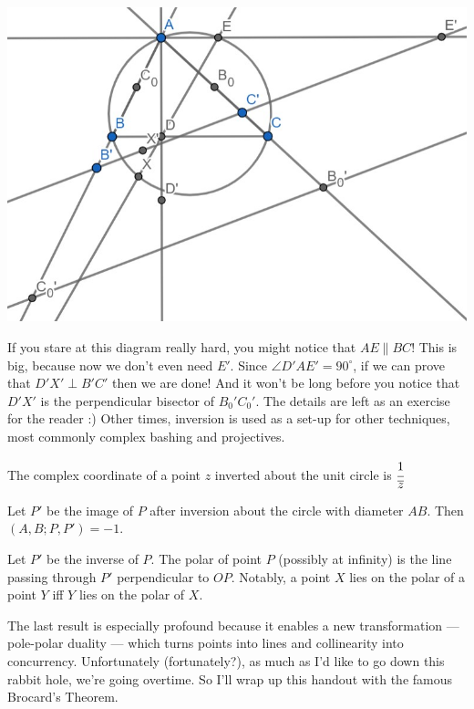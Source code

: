 \documentclass{scrartcl}
\begin{document}
\begin{center}
    \includegraphics[scale=0.8]{isl2011g4r2.jpg}
\end{center}
If you stare at this diagram really hard, you might notice that $AE \parallel BC$! This is big, because now we don't even need $E'$. Since $\angle D'AE'=90^{\circ}$, if we can prove that $D'X' \perp B'C'$ then we are done! And it won't be long before you notice that $D'X'$ is the perpendicular bisector of $B_0'C_0'$. \newline 
The details are left as an exercise for the reader :) \newline 
Other times, inversion is used as a set-up for other techniques, most commonly complex bashing and projectives.
\begin{theorem}
The complex coordinate of a point $z$ inverted about the unit circle is $\cfrac{1}{\overline{z}}$
\end{theorem}
\begin{theorem}
Let $P'$ be the image of $P$ after inversion about the circle with diameter $AB$. Then $(A,B;P,P')=-1$. 
\end{theorem}
\begin{theorem}
Let $P'$ be the inverse of $P$. The polar of point $P$ (possibly at infinity) is the line passing through $P'$ perpendicular to $OP$.\newline
Notably, a point $X$ lies on the polar of a point $Y$ iff $Y$ lies on the polar of $X$. 
\end{theorem}
The last result is especially profound because it enables a new transformation --- pole-polar duality --- which turns points into lines and collinearity into concurrency. Unfortunately (fortunately?), as much as I'd like to go down this rabbit hole, we're going overtime. So I'll wrap up this handout with the famous Brocard's Theorem.
\end{document}
